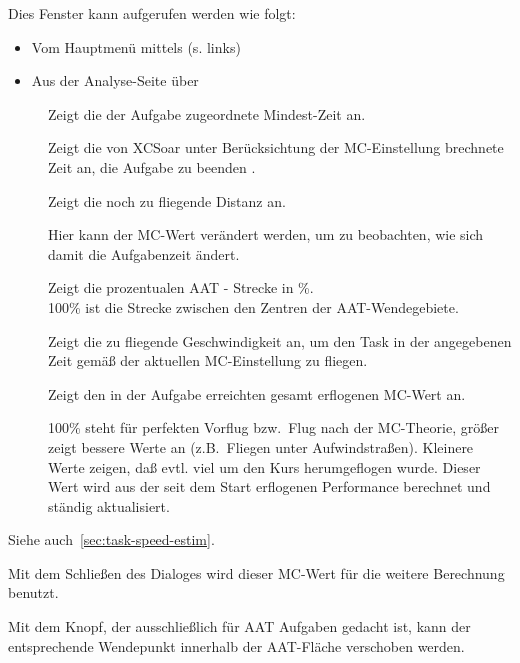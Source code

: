 Dies Fenster kann aufgerufen werden wie folgt:
\begin{itemize}
\item Vom Hauptmenü mittels (s. links)
\item Aus der Analyse-Seite über \blink{}\blink~
\end{itemize}


\begin{description}
\item[]  Zeigt die der Aufgabe zugeordnete Mindest-Zeit an.
\item[]  Zeigt die von \textsf{XCSoar} unter Berücksichtung der MC-Einstellung brechnete Zeit an, die Aufgabe zu beenden .
\item[]  Zeigt die noch zu fliegende Distanz an.
\item[]  Hier kann der MC-Wert verändert werden, um zu beobachten, wie sich damit die Aufgabenzeit ändert. 
\item[] Zeigt die prozentualen AAT - Strecke in \%. \\  100\% ist die Strecke zwischen den Zentren der AAT-Wendegebiete.
\item[]  Zeigt die zu fliegende Geschwindigkeit an, um den Task in der angegebenen Zeit gemäß der aktuellen MC-Einstellung zu fliegen.
\item[]  Zeigt den in der Aufgabe erreichten gesamt erflogenen MC-Wert an.
\item[]  100\% steht für perfekten Vorflug bzw.\ Flug nach der MC-Theorie,  größer zeigt bessere Werte an (z.B.\ Fliegen unter Aufwindstraßen). Kleinere Werte zeigen, daß evtl. viel um den Kurs herumgeflogen wurde.
    Dieser Wert wird aus der seit dem Start erflogenen Performance berechnet und ständig aktualisiert.
\end{description}
Siehe auch~\ref{sec:task-speed-estim}.

Mit dem Schließen des Dialoges wird dieser MC-Wert für die weitere Berechnung benutzt.

Mit dem  Knopf, der ausschließlich für AAT Aufgaben gedacht ist, kann der entsprechende Wendepunkt innerhalb der AAT-Fläche verschoben werden.

